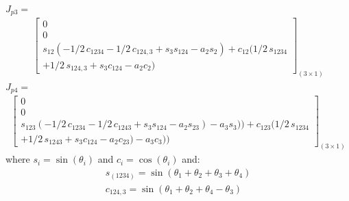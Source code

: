 \documentclass[]{article}
\begin{document}
	$J_{p3}=$
	\begin{align*}
		\begin{bmatrix}
			0	\\
			0	\\
			s_{{12}} ( -1/2\,c_{{1234}}-1/2\,c_{{124,3}}+s_{{3}}s_{{124}}-a_{{2}}s_{{2}})  +c_{{12}} ( 1/2\,s_{{1234}}\\+1/2\,s_{{124,3}}+s_{{3}}c_{{124}}-a_{{2}}c_{{2}} ) 
		\end{bmatrix}_{(3\times1)}
	\end{align*}
	$J_{p4}=$
\begin{align*}
	\begin{bmatrix}
		0\\ 
		0\\ 
		s_{{123}} ( -1/2\,c_{{1234}}-1/2\,c_{{1243}}+s_{{3}}s_{{		124}}-a_{{2}}s_{23} ) -a_{{3}}
		s_3 ) ) + c_{{123}} ( 1/2\,s_{{
		1234}}\\+1/2\,s_{{1243}}+s_{{3}}c_{{124}}-a_{{2}}c_{23} ) -a_{{3}}c_3
		) )
	\end{bmatrix}_{(3\times1)}
\end{align*}
where $s_i=\sin(\theta_i)$ and $c_i=\cos(\theta_i)$ and:
\begin{eqnarray}
	s_{(1234)}=\sin(\theta_1+\theta_2+\theta_3+\theta_4) \nonumber \\
 	c_{124,3}=\sin(\theta_1+\theta_2+\theta_4-\theta_3) \nonumber
\end{eqnarray}
\end{document}

